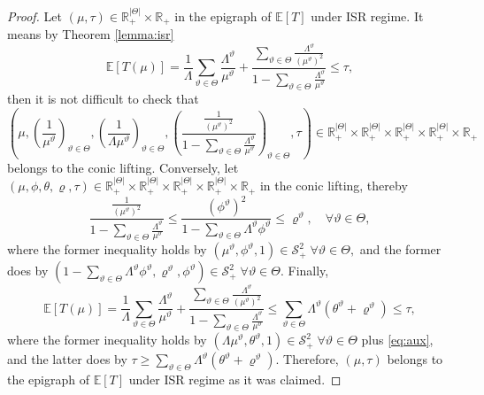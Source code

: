 \documentclass[a4paper,11pt,reqno]{amsart}
\newcommand{\R}{\mathbb{R}}
\newcommand{\E}{\mathbb{E}}
\renewcommand{\SS}{\mathcal{S}}
\begin{document}
\begin{proof}
    Let $(\mu,\tau)\in \R^{|\Theta|}_+\times \R_+$ in the epigraph of $\E[T]$ under ISR regime. It means by Theorem \ref{lemma:isr}
    \begin{equation*}
        \E[T(\mu)]= \frac{1}{\Lambda} \sum_{\vartheta\in \Theta} \frac{\Lambda^\vartheta}{\mu^\vartheta}  +
\frac{ \sum_{\vartheta \in \Theta} \frac{\Lambda^\vartheta}{(\mu^\vartheta)^2}}{
1- \sum_{\vartheta\in \Theta} \frac{\Lambda^\vartheta}{\mu^\vartheta}}\leq \tau,
    \end{equation*}
    then it is not difficult to check that
    \begin{equation*}
        \left(\mu,  \left(\frac{1}{\mu^\vartheta}\right)_{\vartheta\in\Theta},
        \left(\frac{1}{\Lambda\mu^\vartheta}\right)_{\vartheta\in\Theta},\left(\frac{\frac{1}{(\mu^\vartheta)^2}}{1-\sum_{\vartheta\in\Theta}\frac{\Lambda^\vartheta}{\mu^\vartheta}}\right)_{\vartheta\in\Theta},\tau\right)\in\R^{|\Theta|}_+\times\R^{|\Theta|}_+\times \R^{|\Theta|}_+\times \R^{|\Theta|}_+\times \R_+
    \end{equation*}
    belongs to the conic lifting. Conversely, let $(\mu,\phi,\theta,\varrho,\tau)\in \R^{|\Theta|}_+\times\R^{|\Theta|}_+\times \R^{|\Theta|}_+\times \R^{|\Theta|}_+\times \R_+$ in the conic lifting, thereby
    \begin{equation}\label{eq:aux}
        \frac{\frac{1}{(\mu^\vartheta)^2}}{1-\sum_{\vartheta\in\Theta}\frac{\Lambda^\vartheta}{\mu^\vartheta}}\leq \frac{(\phi^\vartheta)^2}{1-\sum_{\vartheta\in\Theta}\Lambda^\vartheta\phi^\vartheta}\leq \varrho^\vartheta, \quad \forall \vartheta \in \Theta,
    \end{equation}
    where the former inequality holds by $(\mu^\vartheta, \phi^\vartheta,1)\in \SS^2_+\;  \forall \vartheta\in\Theta,$ and the former does by $\left(1-\sum_{\vartheta\in\Theta} \Lambda^\vartheta\phi^\vartheta, \varrho^\vartheta, \phi^\vartheta\right)\in \SS^2_+\; \forall \vartheta\in\Theta$. Finally,
    \begin{equation*}
        \E[T(\mu)]= \frac{1}{\Lambda} \sum_{\vartheta\in \Theta} \frac{\Lambda^\vartheta}{\mu^\vartheta}  +
\frac{ \sum_{\vartheta \in \Theta} \frac{\Lambda^\vartheta}{(\mu^\vartheta)^2}}{
1- \sum_{\vartheta\in \Theta} \frac{\Lambda^\vartheta}{\mu^\vartheta}} \leq \sum_{\vartheta\in\Theta} \Lambda^\vartheta(\theta^\vartheta+\varrho^\vartheta) \leq \tau,
    \end{equation*}
    where the former inequality holds by $\left(\Lambda\mu^\vartheta, \theta^\vartheta,1\right)\in \SS^2_+\;  \forall \vartheta\in\Theta$ plus \eqref{eq:aux}, and the latter does by $\tau \geq \sum_{\vartheta\in\Theta} \Lambda^\vartheta(\theta^\vartheta+\varrho^\vartheta)$. Therefore, $(\mu,\tau)$ belongs to the epigraph of $\E[T]$ under ISR regime as it was claimed.
\end{proof}
\end{document}
